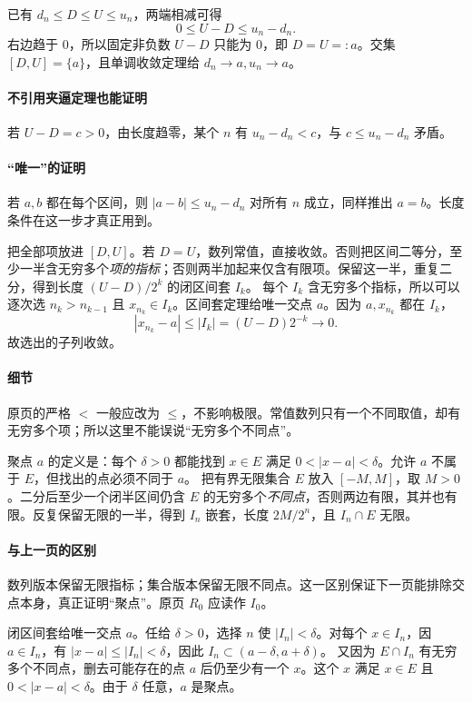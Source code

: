 已有 $d_n\le D\le U\le u_n$，两端相减可得
\[0\le U-D\le u_n-d_n.\]
右边趋于 $0$，所以固定非负数 $U-D$ 只能为 $0$，即 $D=U=:a$。交集 $[D,U]=\{a\}$，且单调收敛定理给 $d_n\to a,u_n\to a$。
\paragraph{不引用夹逼定理也能证明}若 $U-D=c>0$，由长度趋零，某个 $n$ 有 $u_n-d_n<c$，与 $c\le u_n-d_n$ 矛盾。
\paragraph{“唯一”的证明}若 $a,b$ 都在每个区间，则 $|a-b|\le u_n-d_n$ 对所有 $n$ 成立，同样推出 $a=b$。长度条件在这一步才真正用到。

把全部项放进 $[D,U]$。若 $D=U$，数列常值，直接收敛。否则把区间二等分，至少一半含无穷多个\emph{项的指标}；否则两半加起来仅含有限项。保留这一半，重复二分，得到长度 $(U-D)/2^k$ 的闭区间套 $I_k$。
每个 $I_k$ 含无穷多个指标，所以可以逐次选 $n_k>n_{k-1}$ 且 $x_{n_k}\in I_k$。区间套定理给唯一交点 $a$。因为 $a,x_{n_k}$ 都在 $I_k$，
\[|x_{n_k}-a|\le |I_k|=(U-D)2^{-k}\longrightarrow0.\]
故选出的子列收敛。
\paragraph{细节}原页的严格 $<$ 一般应改为 $\le$，不影响极限。常值数列只有一个不同取值，却有无穷多个项；所以这里不能误说“无穷多个不同点”。

聚点 $a$ 的定义是：每个 $\delta>0$ 都能找到 $x\in E$ 满足 $0<|x-a|<\delta$。允许 $a$ 不属于 $E$，但找出的点必须不同于 $a$。
把有界无限集合 $E$ 放入 $[-M,M]$，取 $M>0$。二分后至少一个闭半区间仍含 $E$ 的无穷多个\emph{不同点}，否则两边有限，其并也有限。反复保留无限的一半，得到 $I_n$ 嵌套，长度 $2M/2^n$，且 $I_n\cap E$ 无限。
\paragraph{与上一页的区别}数列版本保留无限指标；集合版本保留无限不同点。这一区别保证下一页能排除交点本身，真正证明“聚点”。原页 $R_0$ 应读作 $I_0$。

闭区间套给唯一交点 $a$。任给 $\delta>0$，选择 $n$ 使 $|I_n|<\delta$。对每个 $x\in I_n$，因 $a\in I_n$，有 $|x-a|\le|I_n|<\delta$，因此 $I_n\subset(a-\delta,a+\delta)$。
又因为 $E\cap I_n$ 有无穷多个不同点，删去可能存在的点 $a$ 后仍至少有一个 $x$。这个 $x$ 满足 $x\in E$ 且 $0<|x-a|<\delta$。由于 $\delta$ 任意，$a$ 是聚点。
